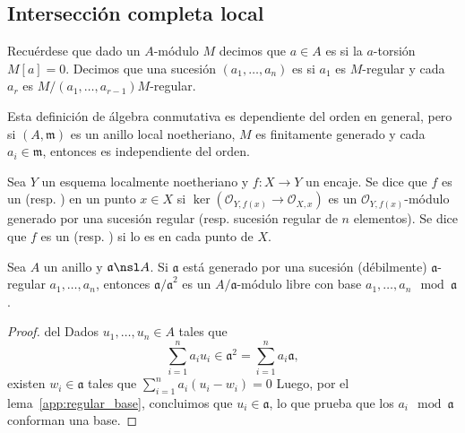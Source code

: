 \subsection{Intersección completa local}
Recuérdese que dado un $A$-módulo $M$ decimos que $a \in A$ es  si la $a$-torsión $M[a] = 0$.
Decimos que una sucesión $(a_1, \dots, a_n)$ es  si $a_1$ es $M$-regular y cada $a_r$
es $M/(a_1, \dots, a_{r-1})M$-regular.

\warn
Esta definición de álgebra conmutativa es dependiente del orden en general, pero si $(A, \mathfrak{m})$ es un anillo local noetheriano,
$M$ es finitamente generado y cada $a_i \in \mathfrak{m}$, entonces es independiente del orden.

\begin{mydef}
	Sea $Y$ un esquema localmente noetheriano y $f \colon X \to Y$ un encaje.
	Se dice que $f$ es un  (resp. )%
	 en un punto $x \in X$ si $\ker( \mathscr{O}_{Y, f(x)} \to \mathscr{O}_{X, x} )$ es un
	$\mathscr{O}_{Y, f(x)}$-módulo generado por una sucesión regular (resp. sucesión regular de $n$ elementos).
	Se dice que $f$ es un  (resp. ) si lo es en cada punto de $X$.
\end{mydef}

\begin{lem}\label{thm:a2quot_free}
	Sea $A$ un anillo y $\mathfrak{a} \nsl A$.
	Si $\mathfrak{a}$ está generado por una sucesión (débilmente) $\mathfrak{a}$-regular $a_1, \dots, a_n$,
	entonces $\mathfrak{a/a}^2$ es un $A/\mathfrak{a}$-módulo libre con base $a_1, \dots, a_n \mod{\mathfrak{a}}$.
\end{lem}
\begin{proof}
	del 
	Dados $u_1, \dots, u_n \in A$ tales que
	$$ \sum_{i=1}^{n} a_iu_i \in \mathfrak{a}^2 = \sum_{i=1}^{n} a_i\mathfrak{a}, $$
	existen $w_i \in \mathfrak{a}$ tales que $\sum_{i=1}^{n} a_i(u_i - w_i) = 0$
	Luego, por el lema~\ref{app:regular_base}, concluimos que $u_i \in \mathfrak{a}$, lo que prueba que los $a_i \mod{\mathfrak{a}}$
	conforman una base.
\end{proof}

